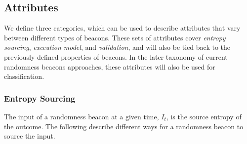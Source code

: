 \subsection{Attributes}
We define three categories, which can be used to describe attributes that vary between different types of beacons.
These sets of attributes cover \emph{entropy sourcing}, \emph{execution model}, and \emph{validation}, and will also be tied back to the previously defined properties of beacons.
In the later taxonomy of current randomness beacons approaches, these attributes will also be used for classification.

\subsubsection{Entropy Sourcing}
The input of a randomness beacon at a given time, $I_t$, is the source entropy of the outcome.
The following describe different ways for a randomness beacon to source the input.
